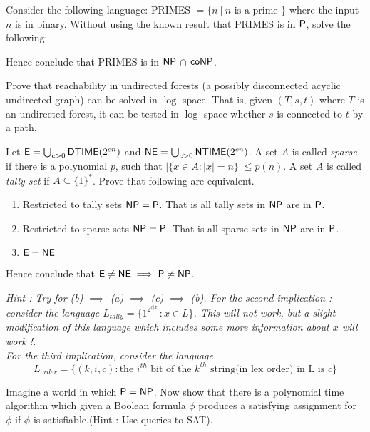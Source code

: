 \documentclass[addpoints,12pt]{exam}
\begin{document}
\begin{questions}
\question[15]
Consider the following language: PRIMES $= \{ n ~|~ n
\textrm{ is a prime } \}$ where the input $n$ is in binary.  Without
using the known result that PRIMES is in $\P$, solve the following:
Hence conclude that PRIMES is in $\NP$ $\cap$ $\co\NP$.


\question[10] Prove that reachability in undirected forests (a possibly disconnected acyclic undirected graph) can be solved in $\log$-space. That is, given $(T,s,t)$ where $T$ is an undirected forest, it can be tested in $\log$-space whether $s$ is connected to $t$ by a path.

\question[18]
Let $\E = \bigcup_{c > 0} \DTIME(2^{cn})$ and $\NE = \bigcup_{c > 0} \NTIME(2^{cn})$. A set $A$ is called {\em sparse} if there is a polynomial $p$,
    such that $|\{ x \in A : |x| = n \}| \le p(n)$. A set $A$ is called
    {\em tally set} if $A \subseteq \{1\}^*$.  Prove that following
    are equivalent.
  \begin{enumerate}
  \item Restricted to tally sets $\NP = \P$. That is all tally sets in $\NP$ are in $\P$.
  \item Restricted to sparse sets $\NP = \P$. That is all sparse sets
    in $\NP$ are in $\P$.
  \item $\E = \NE$
  \end{enumerate}
  Hence conclude that $\E \ne \NE \implies \P \ne \NP$.
  
  \emph{Hint : Try for (b) $\implies$ (a) $\implies$ (c) $\implies$ (b). 
  For the second implication : consider the language $L_{tally} = \{1^{2^{c|x|}} : x \in L\}$.
  This will not work, but a slight modification of this language which includes some more information about 
  $x$ will work !. \\ For the third implication, consider the language 
\[ L_{order} = \{(k,i,c): \textrm{the $i^{th}$ bit of the $k^{th}$ string(in lex order) in L is $c$} \} \] }

\question[7] 
Imagine a world in which $\P = \NP$. Now show that there is a
polynomial time algorithm which given a Boolean formula $\phi$ produces a satisfying assignment for $\phi$ if $\phi$ is satisfiable.(Hint : Use queries to SAT).

\end{questions}
\end{document}
